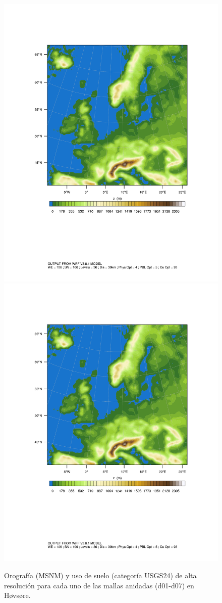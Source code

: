 \documentclass[mathserif,10pt]{beamer}
\begin{document}
\begin{frame}{}
	\begin{figure}[H]
		\centering
		
		\includegraphics[width=0.25\linewidth,page=13,trim={2cm 6.5cm 1cm 3.5cm},clip]{fig/05/hov_domain.pdf}%
		\includegraphics[width=0.25\linewidth,page=14,trim={2cm 6.5cm 1cm 3.5cm},clip]{fig/05/hov_domain.pdf}%
		
		\caption{Orografía (MSNM) y uso de suelo (categoría USGS24) de alta resolución para cada uno de las mallas anidadas (d01-d07) en Høvsøre.}
		\label{fig:dominios_hov2}
	\end{figure}
\end{frame}
\end{document}
